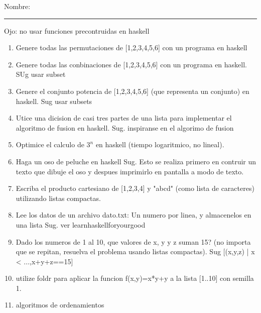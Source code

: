 \documentclass{exam}
\begin{document}
Nombre: \hrule
Ojo: no usar funciones precontruidas en haskell

\begin{enumerate}
\item Genere todas las permutaciones de [1,2,3,4,5,6] con un programa en haskell
\item Genere todas las conbinaciones de [1,2,3,4,5,6] con un programa en haskell. SUg usar subset
\item Genere el conjunto potencia de [1,2,3,4,5,6] (que representa un conjunto) en haskell. Sug usar subsets
\item Utice una dicision de casi tres partes de una lista para implementar
el algoritmo de fusion en haskell. Sug. inspiranse en el algorimo de fusion
\item Optimice el calculo de $3^n$ en haskell (tiempo logaritmico, no lineal).
\item Haga un oso de peluche en haskell Sug. Esto se realiza primero en contruir un texto que dibuje el oso y despues imprimirlo en pantalla a modo de texto.
\item Escriba el producto cartesiano de [1,2,3,4] y "abcd" (como lista de caracteres)
utilizando listas compactas.
\item Lee los datos de un archivo dato.txt: Un numero por linea, y almacenelos en una lista Sug. ver learnhaskellforyourgood
\item Dado los numeros de 1 al 10, que valores de x, y y z suman 15? (no importa
que se repitan, resuelva el problema usando listas compactas). Sug [(x,y,z) | x < ...,x+y+z==15]
\item utilize foldr para aplicar la funcion f(x,y)=x*y+y a la lista [1..10]
con semilla 1.
\item algoritmos de ordenamientos
\end{enumerate}
\end{document}
